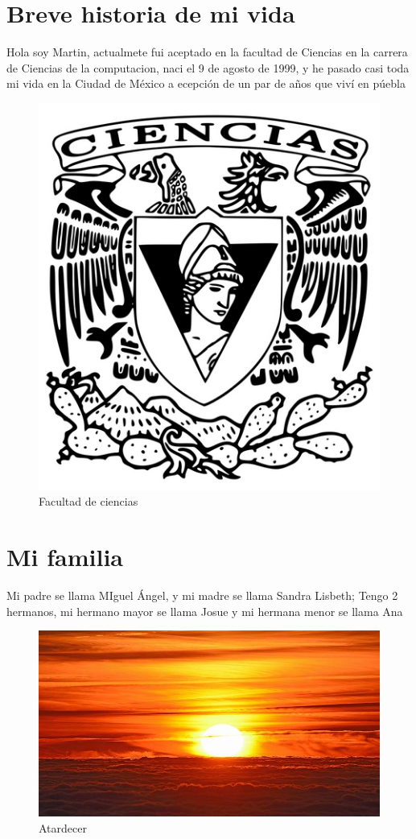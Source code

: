 \chapter{Breve historia de mi vida}

Hola soy Martin, actualmete  fui aceptado en la facultad de Ciencias en la carrera de Ciencias de la computacion, naci el 9 de agosto de 1999, y he pasado casi toda mi vida en la Ciudad de México a ecepción de un par de años que viví en púebla

\begin{figure}[h]
  \centering
  \includegraphics[scale=0.5]{IMG/19_2.jpg}
  \caption{Facultad de ciencias}
  \label{fig:facultad}
\end{figure}


\chapter*{Mi familia}

Mi padre se llama MIguel Ángel, y mi madre se llama Sandra Lisbeth; Tengo 2 hermanos, mi hermano mayor se llama Josue y mi hermana menor se llama Ana

\begin{figure}[h]
  \centering
  \includegraphics[scale=0.5]{IMG/19_4.jpg}
  \caption{Atardecer}
  \label{fig:atardecer}
\end{figure}


